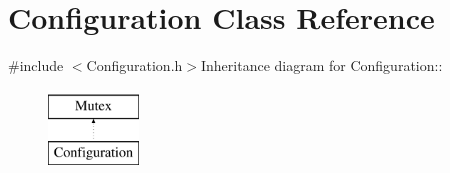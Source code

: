 \hypertarget{classConfiguration}{
\section{Configuration Class Reference}
\label{classConfiguration}
}


{\ttfamily \#include $<$Configuration.h$>$}Inheritance diagram for Configuration::\begin{figure}[H]
\begin{center}
\leavevmode
\includegraphics[height=2cm]{classConfiguration}
\end{center}
\end{figure}
